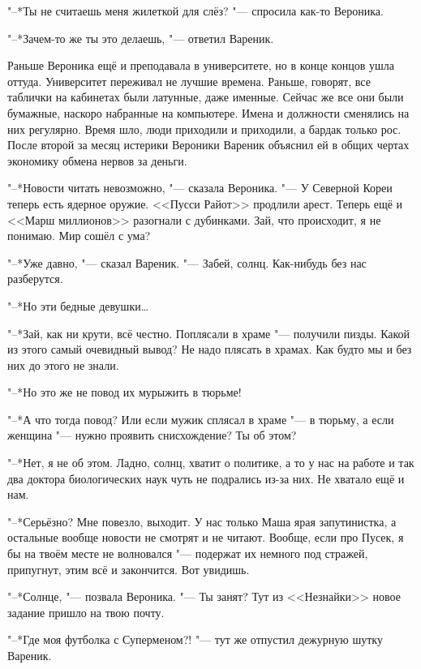 "--*Ты не считаешь меня жилеткой для слёз? "--- спросила как-то Вероника.

"--*Зачем-то же ты это делаешь, "--- ответил Вареник.

Раньше Вероника ещё и преподавала в университете, но в конце концов ушла оттуда.
Университет переживал не лучшие времена.
Раньше, говорят, все таблички на кабинетах были латунные, даже именные.
Сейчас же все они были бумажные, наскоро набранные на компьютере.
Имена и должности сменялись на них регулярно.
Время шло, люди приходили и приходили, а бардак только рос.
После второй за месяц истерики Вероники Вареник объяснил ей в общих чертах экономику обмена нервов за деньги.

\asterism

\textspace

\label{Thu_2012_05_10}

"--*Новости читать невозможно, "--- сказала Вероника.
"--- У Северной Кореи теперь есть ядерное оружие.
<<Пусси Райот>> продлили арест.
Теперь ещё и <<Марш миллионов>> разогнали с дубинками.
Зай, что происходит, я не понимаю.
Мир сошёл с ума?

"--*Уже давно, "--- сказал Вареник.
"--- Забей, солнц.
Как-нибудь без нас разберутся.

"--*Но эти бедные девушки\ldots{}

"--*Зай, как ни крути, всё честно.
Поплясали в храме "--- получили пизды.
Какой из этого самый очевидный вывод?
Не надо плясать в храмах.
Как будто мы и без них до этого не знали.

"--*Но это же не повод их мурыжить в тюрьме!

"--*А что тогда повод?
Или если мужик сплясал в храме "--- в тюрьму, а если женщина "--- нужно проявить снисхождение?
Ты об этом?

"--*Нет, я не об этом.
Ладно, солнц, хватит о политике, а то у нас на работе и так два доктора биологических наук чуть не подрались из-за них.
Не хватало ещё и нам.

"--*Серьёзно?
Мне повезло, выходит.
У нас только Маша ярая запутинистка, а остальные вообще новости не смотрят и не читают.
Вообще, если про Пусек, я бы на твоём месте не волновался "--- подержат их немного под стражей, припугнут, этим всё и закончится.
Вот увидишь.

\textspace

"--*Солнце, "--- позвала Вероника.
"--- Ты занят?
Тут из <<Незнайки>> новое задание пришло на твою почту.

"--*Где моя футболка с Суперменом?! "--- тут же отпустил дежурную шутку Вареник.

